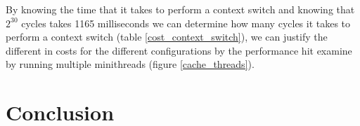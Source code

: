 \documentclass[12pt,a4paper]{report}
\begin{document}
By knowing the time that it takes to perform a context switch and knowing that $2^{30}$ cycles takes 1165 milliseconds we can determine how many cycles it takes to perform a context switch (table \ref{cost_context_switch}), we can justify the different in costs for the different configurations by the performance hit examine by running multiple minithreads (figure \ref{cache_threads}).
\clearpage
\clearpage
\chapter{Conclusion}
\end{document}
